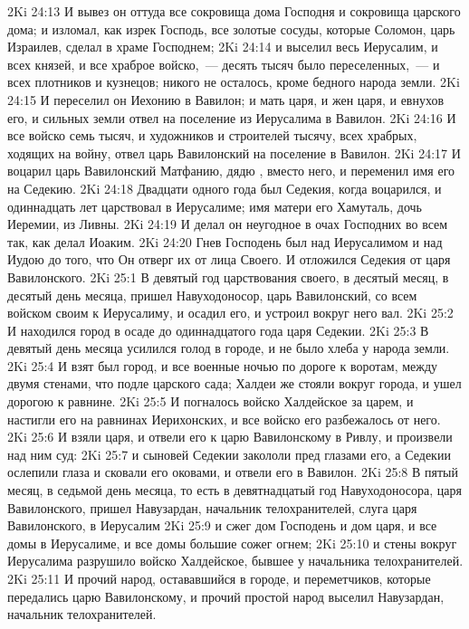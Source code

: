 \vs 2Ki 24:13 И вывез он оттуда все сокровища дома Господня и сокровища царского дома; и изломал, как изрек Господь, все золотые сосуды, которые Соломон, царь Израилев, сделал в храме Господнем;
\vs 2Ki 24:14 и выселил весь Иерусалим, и всех князей, и все храброе войско,~--- десять тысяч было переселенных,~--- и всех плотников и кузнецов; никого не осталось, кроме бедного народа земли.
\vs 2Ki 24:15 И переселил он Иехонию в Вавилон; и мать царя, и жен царя, и евнухов его, и сильных земли отвел на поселение из Иерусалима в Вавилон.
\vs 2Ki 24:16 И все войско  семь тысяч, и художников и строителей тысячу, всех храбрых, ходящих на войну, отвел царь Вавилонский на поселение в Вавилон.
\vs 2Ki 24:17 И воцарил царь Вавилонский Матфанию, дядю , вместо него, и переменил имя его на Седекию.
\rsbpar\vs 2Ki 24:18 Двадцати одного года был Седекия, когда воцарился, и одиннадцать лет царствовал в Иерусалиме; имя матери его Хамуталь, дочь Иеремии, из Ливны.
\vs 2Ki 24:19 И делал он неугодное в очах Господних во всем так, как делал Иоаким.
\vs 2Ki 24:20 Гнев Господень был над Иерусалимом и над Иудою до того, что Он отверг их от лица Своего. И отложился Седекия от царя Вавилонского.
\vs 2Ki 25:1 В девятый год царствования своего, в десятый месяц, в десятый день месяца, пришел Навуходоносор, царь Вавилонский, со всем войском своим к Иерусалиму, и осадил его, и устроил вокруг него вал.
\vs 2Ki 25:2 И находился город в осаде до одиннадцатого года царя Седекии.
\vs 2Ki 25:3 В девятый день месяца усилился голод в городе, и не было хлеба у народа земли.
\vs 2Ki 25:4 И взят был город, и  все военные ночью по дороге к воротам, между двумя стенами, что подле царского сада; Халдеи же стояли вокруг города, и  ушел дорогою к равнине.
\vs 2Ki 25:5 И погналось войско Халдейское за царем, и настигли его на равнинах Иерихонских, и все войско его разбежалось от него.
\vs 2Ki 25:6 И взяли царя, и отвели его к царю Вавилонскому в Ривлу, и произвели над ним суд:
\vs 2Ki 25:7 и сыновей Седекии закололи пред глазами его, а  Седекии ослепили глаза и сковали его оковами, и отвели его в Вавилон.
\rsbpar\vs 2Ki 25:8 В пятый месяц, в седьмой день месяца, то есть в девятнадцатый год Навуходоносора, царя Вавилонского, пришел Навузардан, начальник телохранителей, слуга царя Вавилонского, в Иерусалим
\vs 2Ki 25:9 и сжег дом Господень и дом царя, и все домы в Иерусалиме, и все домы большие сожег огнем;
\vs 2Ki 25:10 и стены вокруг Иерусалима разрушило войско Халдейское, бывшее у начальника телохранителей.
\vs 2Ki 25:11 И прочий народ, остававшийся в городе, и переметчиков, которые передались царю Вавилонскому, и прочий простой народ выселил Навузардан, начальник телохранителей.
